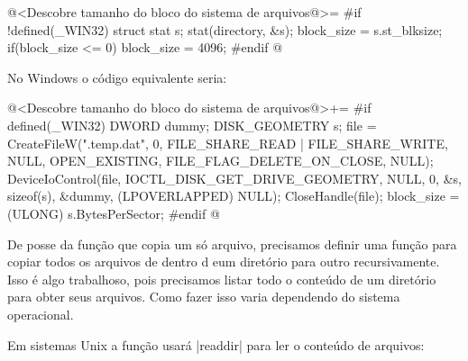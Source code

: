 \iniciocodigo
@<Descobre tamanho do bloco do sistema de arquivos@>=
#if !defined(_WIN32)
{
  struct stat s;
  stat(directory, &s);
  block_size = s.st_blksize;
  if(block_size <= 0){
    block_size = 4096;
  }
}
#endif
@
\fimcodigo

No Windows o código equivalente seria:

\iniciocodigo
@<Descobre tamanho do bloco do sistema de arquivos@>+=
#if defined(_WIN32)
{
  DWORD dummy;
  DISK_GEOMETRY s;
  file = CreateFileW(".temp.dat", 0, FILE_SHARE_READ | FILE_SHARE_WRITE,
                     NULL, OPEN_EXISTING, FILE_FLAG_DELETE_ON_CLOSE, NULL);
  DeviceIoControl(file, IOCTL_DISK_GET_DRIVE_GEOMETRY, NULL, 0, &s,
                  sizeof(s), &dummy, (LPOVERLAPPED) NULL);
  CloseHandle(file);
  block_size = (ULONG) s.BytesPerSector;
}
#endif
@
\fimcodigo


De posse da função que copia um só arquivo, precisamos definir uma
função para copiar todos os arquivos de dentro d eum diretório para
outro recursivamente. Isso é algo trabalhoso, pois precisamos listar
todo o conteúdo de um diretório para obter seus arquivos. Como fazer
isso varia dependendo do sistema operacional.


Em sistemas Unix a função usará |readdir| para ler o conteúdo de
arquivos:

